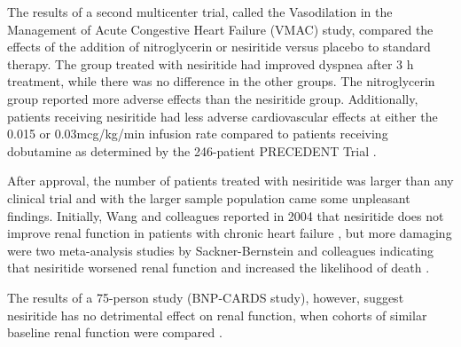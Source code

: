 \documentclass[14pt,a4paper,onecolumn]{extarticle}
\begin{document}
The results of a second multicenter trial, called the Vasodilation in the Management of Acute Congestive Heart Failure (VMAC) study, compared the effects of the addition of nitroglycerin or nesiritide versus placebo to standard therapy. The group treated with nesiritide had improved dyspnea after 3 h treatment, while there was no difference in the other groups. The nitroglycerin group reported more adverse effects than the nesiritide group. Additionally, patients receiving nesiritide had less adverse cardiovascular effects at either the 0.015 or 0.03mcg/kg/min infusion rate compared to patients receiving dobutamine as determined by the 246-patient PRECEDENT Trial \citep{deLissovoy2003}.



After approval, the number of patients treated with nesiritide was larger than any clinical trial and with the larger sample population came some unpleasant findings. Initially, Wang and colleagues reported in 2004 that nesiritide does not improve renal function in patients with chronic heart failure \citep{Wang2004a}, but more damaging were two meta-analysis studies by Sackner-Bernstein and colleagues indicating that nesiritide worsened renal function and increased the likelihood of death \citep{Sackner-Bernstein2005a} \citep{Sackner-Bernstein2005b}.



The results of a 75-person study (BNP-CARDS study), however, suggest nesiritide has no detrimental effect on renal function, when cohorts of similar baseline renal function were compared \citep{Witteles2007}.




\end{document}
